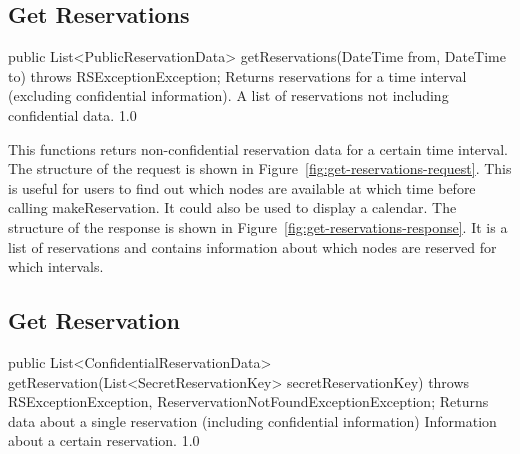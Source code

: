 \documentclass[a4paper,11pt]{article}
\begin{document}
			\subsection{Get Reservations}

\begin{apidoc}
	{public List<PublicReservationData> getReservations(DateTime from, DateTime to) throws RSExceptionException;} %
	{Returns reservations for a time interval (excluding confidential information).} %
	{
	} %
	{A list of reservations not including confidential data.} %
	{} %
	{1.0} %
\end{apidoc}

This functions returs non-confidential reservation data for a certain time interval. The structure of the request is shown in Figure~\ref{fig:get-reservations-request}. This is useful for users to find out which nodes are available at which time before calling makeReservation. It could also be used to display a calendar. The structure of the response is shown in Figure~\ref{fig:get-reservations-response}. It is a list of reservations and contains information about which nodes are reserved for which intervals. 

	
			\sectionfin
			\subsection{Get Reservation}
	
\begin{apidoc}
	{public List<ConfidentialReservationData> getReservation(List<SecretReservationKey> secretReservationKey) throws RSExceptionException, ReservervationNotFoundExceptionException;} %
	{Returns data about a single reservation (including confidential information)} %
	{
	} %
	{Information about a certain reservation.} %
	{} %
	{1.0} %
\end{apidoc}
	
\end{document}
